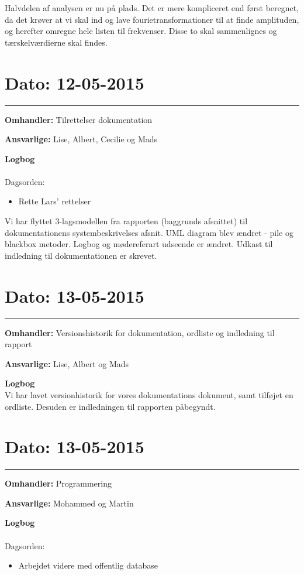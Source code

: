 Halvdelen af analysen er nu på plads. Det er mere kompliceret end først beregnet, da det krøver at vi skal ind og lave fourietransformationer til at finde amplituden, og herefter omregne hele listen til frekvenser. Disse to skal sammenlignes og tærskelværdierne skal findes. 


\section{Dato: 12-05-2015}
\hrule
\textbf{Omhandler:} Tilrettelser dokumentation

\textbf{Ansvarlige:} Lise, Albert, Cecilie og Mads

\textbf{Logbog}
\\
\\
Dagsorden:
\begin{itemize}
	\item Rette Lars' rettelser
\end{itemize}

Vi har flyttet 3-lagsmodellen fra rapporten (baggrunds afsnittet) til dokumentationens systembeskrivelses afsnit. UML diagram blev ændret - pile og blackbox metoder. Logbog og mødereferart udseende er ændret. Udkast til indledning til dokumentationen er skrevet. 

\section{Dato: 13-05-2015}
\hrule
\textbf{Omhandler:} Versionshistorik for dokumentation, ordliste og indledning til rapport

\textbf{Ansvarlige:} Lise, Albert og Mads

\textbf{Logbog}
\\
Vi har lavet versionhistorik for vores dokumentations dokument, samt tilføjet en ordliste.
Desuden er indledningen til rapporten påbegyndt.

\section{Dato: 13-05-2015}
\hrule
\textbf{Omhandler:} Programmering

\textbf{Ansvarlige:} Mohammed og Martin

\textbf{Logbog}
\\
\\
Dagsorden:
\begin{itemize}
	\item Arbejdet videre med offentlig database
\end{itemize}

